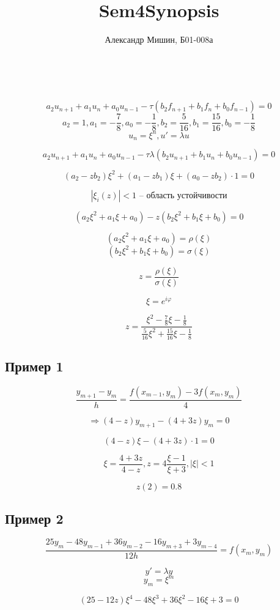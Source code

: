\documentclass[a4paper,12pt]{article}
\title{Sem4Synopsis}
\begin{document}
\author{Александр Мишин, Б01-008а}
\date{}
\maketitle\

\[a_2 u_{n+1} + a_1 u_n + a_0 u_{n-1} - \tau (b_2 f_{n+1} + b_1 f_n + b_0 f_{n-1} ) = 0\]
\[a_2 = 1, a_1 = -\frac{7}{8}, a_0 = -\frac{1}{8}, b_2 = \frac{5}{16}, b_1 = \frac{15}{16}, b_0 = -\frac{1}{8} \]
\[u_n = \xi^n, u' = \lambda u\]

\[a_2 u_{n+1} + a_1 u_n + a_0 u_{n-1} - \tau \lambda (b_2 u_{n+1} + b_1 u_n + b_0 u_{n-1}) = 0\]

\[(a_2 - z b_2) \xi^2 + (a_1 - zb_1) \xi + (a_0 - zb_2) \cdot 1 = 0\]

\[|\xi_i(z)| < 1 \text{ -- область устойчивости}\]

\[(a_2 \xi^2 + a_1 \xi + a_0) - z (b_2 \xi^2 + b_1 \xi + b_0) = 0\]

\[(a_2 \xi^2 + a_1 \xi + a_0) = \rho(\xi)\]
\[(b_2 \xi^2 + b_1 \xi + b_0) = \sigma(\xi)\]

\[z = \frac{\rho(\xi)}{\sigma(\xi)}\]

\[\xi = e^{i\varphi}\]

\[z = \frac{\xi^2 - \frac{7}{8}\xi - \frac{1}{8}}{\frac{5}{16}\xi^2 + \frac{15}{16}\xi - \frac{1}{8}}\]

\subsection*{Пример 1}

\[\frac{y_{m+1} -y_m}{h} = \frac{f(x_{m-1}, y_m) - 3f(x_m, y_m)}{4}\]

\[\Rightarrow (4-z)y_{m+1} - (4 + 3z)y_m = 0\]

\[(4-z)\xi - (4+3z) \cdot 1 = 0\]

\[\xi = \frac{4 + 3z}{4 - z}, z = 4 \frac{\xi - 1}{\xi + 3}, |\xi| < 1\]

\[z(2) = 0.8\]

\subsection*{Пример 2}

\[\frac{25 y_m - 48 y_{m-1} + 36 y_{m-2} - 16 y_{m+3} + 3 y_{m-4}}{12h} = f(x_m, y_m)\]

\[y' = \lambda y\]
\[y_m = \xi^m\]

\[(25 - 12z) \xi^4 - 48 \xi^3 + 36 \xi^2 - 16 \xi + 3 = 0\]
\end{document}
